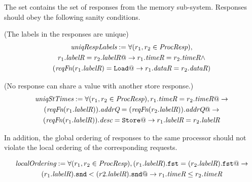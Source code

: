 The \Response{} set contains the set of responses from the memory sub-system.
Responses should obey the following sanity conditions. 
\begin{defn} (The labels in the responses are unique)
\small
\begin{multline*}
\textit{uniqRespLabels} := \forall (r_1, r_2 \in \textit{ProcResp}),\\
r_1.\textit{labelR} = r_2.\textit{labelR} @-> r_1.\textit{timeR} = r_2.\textit{timeR} \wedge\\
(\textit{reqFn}(r_1.\textit{labelR}) = \texttt{Load} @-> r_1.\textit{dataR} = r_2.\textit{dataR})
\end{multline*}
\end{defn}

\begin{defn} (No response can share a \timeR{} value with another store response.)
\small
\begin{multline*}
\textit{uniqStTimes} := 
\forall (r_1, r_2 \in \textit{ProcResp}),
r_1.\textit{timeR} = r_2.\textit{timeR} @-> \\
(\textit{reqFn} (r_1.\textit{labelR})).\textit{addrQ} = (\textit{reqFn} (r_2.\textit{labelR})).\textit{addrQ} @->\\
(\textit{reqFn} (r_1.\textit{labelR})).\textit{desc} = \texttt{Store} @->
r_1.\textit{labelR} = r_2.\textit{labelR}
\end{multline*}
\end{defn}

In addition, the global ordering of responses to the same processor should not
violate the local ordering of the corresponding requests.

\begin{defn}
\small
\begin{multline*}
\textit{localOrdering} :=
\forall (r_1, r_2 \in \textit{ProcResp}), (r_1.\textit{labelR}).\texttt{fst} = (r_2.\textit{labelR}).\texttt{fst} @->\\
(r_1.\textit{labelR}).\texttt{snd} < (r2.\textit{labelR}).\texttt{snd} @-> r_1.\textit{timeR} \le r_2.\textit{timeR}
\end{multline*}
\end{defn}

